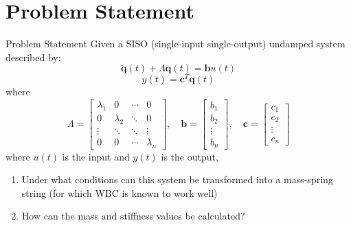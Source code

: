 \documentclass{beamer}
\begin{document}
\section{Problem Statement}
\begin{frame}{Problem Statement}
Given a SISO (single-input single-output) undamped system described by:
\begin{equation}
\ddot{\mathbf{q}}(t) + \Lambda\mathbf{q}(t) = \mathbf{b}u(t)
\label{eq:modal1}
\end{equation}
\begin{equation}
y(t) = \mathbf{c}^T \mathbf{q}(t)
\label{eq:modal2}
\end{equation}
where
\begin{equation}
\Lambda = \begin{bmatrix}
\lambda_1  &  0 & \cdots & 0 \\
0 & \lambda_2  & \ddots & 0 \\
\vdots & \ddots & \ddots & \vdots \\
0 & 0 & \cdots & \lambda_n \end{bmatrix}
,\quad \mathbf{b} = \begin{bmatrix} b_1 \\ b_2 \\ \vdots \\ b_n \end{bmatrix}
,\quad \mathbf{c} = \begin{bmatrix} c_1 \\ c_2 \\ \vdots \\ c_n \end{bmatrix}
\label{eq:modal3}
\end{equation}
where $u(t)$ is the input and $y(t)$ is the output,
\begin{enumerate}
\item Under what conditions can this system be transformed into a mass-spring string (for which WBC is known to work well)
\item How can the mass and stiffness values be calculated?
\end{enumerate}
\end{frame}
\end{document}

